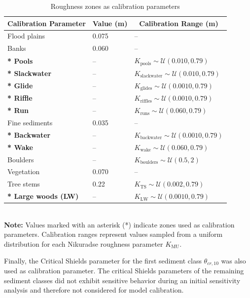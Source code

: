 \documentclass[draft,linenumbers,onecolumn]{agujournal2019} %
\begin{document}
\begin{table}[H]
	\centering
	\caption{Roughness zones as calibration parameters}
	\begin{tabular}{p{5.5cm} p{3cm} p{5.5cm}}
		\hline
		\multicolumn{1}{c}{\textbf{Calibration Parameter}} & 
		\multicolumn{1}{c}{\textbf{Value (m)}} & 
		\multicolumn{1}{c}{\textbf{Calibration Range (m)}} \\ \hline
		Flood plains              & 0.075   & -- \\
		Banks                     & 0.060   & -- \\
		\textbf{* Pools}           & --   & \( K_{\text{pools}} \sim \mathcal{U}(0.010, 0.79) \) \\
		\textbf{* Slackwater}      & --   & \( K_{\text{slackwater}} \sim \mathcal{U}(0.010, 0.79) \) \\
		\textbf{* Glide}          & --   & \( K_{\text{glides}} \sim \mathcal{U}(0.0010, 0.79) \) \\
		\textbf{* Riffle}          & --   & \( K_{\text{riffles}} \sim \mathcal{U}(0.0010, 0.79) \) \\
		\textbf{* Run}             & --   & \( K_{\text{runs}} \sim \mathcal{U}(0.060, 0.79) \) \\
		Fine sediments            & 0.035   & -- \\
		\textbf{* Backwater}       & --   & \( K_{\text{backwater}} \sim \mathcal{U}(0.0010, 0.79) \) \\
		\textbf{* Wake}            & --   & \( K_{\text{wake}} \sim \mathcal{U}(0.060, 0.79) \) \\
		{Boulders}        & --   & \( K_{\text{boulders}} \sim \mathcal{U}(0.5, 2) \) \\
		Vegetation                & 0.070   & -- \\
		Tree stems                & {0.22}   & \( K_{\text{TS}} \sim \mathcal{U}(0.002,0.79) \) \\
		\textbf{* Large woods (LW)}  & -- & \( K_{\text{LW}} \sim \mathcal{U}(0.0010, 0.79) \) \\ \hline
	\end{tabular}
	\label{tab:roughness_zones}
	\\
	\textbf{Note:} Values marked with an asterisk (*) indicate zones used as calibration parameters. Calibration ranges represent values sampled from a uniform distribution for each Nikuradse roughness parameter \( K_{\text{MU}} \).
\end{table}

Finally, the Critical Shields parameter for the first sediment class \( \theta_{cr,10}\) was also used as calibration parameter.  The critical Shields parameters of the remaining sediment classes did not exhibit sensitive behavior during an initial sensitivity analysis and therefore not considered for model calibration. 
\end{document}
